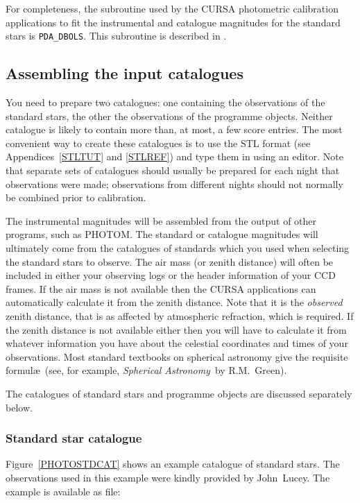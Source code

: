 \documentclass[twoside,11pt]{starlink}
\begin{document}
For completeness, the subroutine used by the CURSA photometric
calibration applications to fit the instrumental and catalogue magnitudes
for the standard stars is \texttt{PDA\_DBOLS}.  This subroutine is
described in \cite{SUN194}.

\subsection{Assembling the input catalogues}

You need to prepare two catalogues: one containing the observations of
the standard stars, the other the observations of the programme objects.
Neither catalogue is likely to contain more than, at most, a few score
entries.  The most convenient way to create these catalogues is to
use the STL format (see Appendices~\ref{STLTUT} and \ref{STLREF}) and
type them in using an editor.  Note that separate sets of catalogues
should usually be prepared for each night that observations were made;
observations from different nights should not normally be combined
prior to calibration.

The instrumental magnitudes will be assembled from the output of other
programs, such as PHOTOM.  The standard or catalogue magnitudes will
ultimately come from the catalogues of standards which you used when
selecting the standard stars to observe.  The air mass (or zenith
distance) will often be included in either your observing logs or the
header information of your CCD frames.  If the air mass is not available
then the CURSA applications can automatically calculate it from the
zenith distance.  Note that it is the \textit{observed}\, zenith distance,
that is as affected by atmospheric refraction, which is required.
If the zenith distance is not available either then you will have to
calculate it from whatever information you have about the celestial
coordinates and times of your observations.  Most standard textbooks on
spherical astronomy give the requisite formul\ae\ (see, for example,
\textit{Spherical Astronomy}\, by R.M.~Green\cite{GREEN}).

The catalogues of standard stars and programme objects are discussed
separately below.

\subsubsection{Standard star catalogue}

Figure~\ref{PHOTOSTDCAT} shows an example catalogue of standard stars.
The observations used in this example were kindly provided by
John~Lucey.  The example is available as file:
\end{document}
